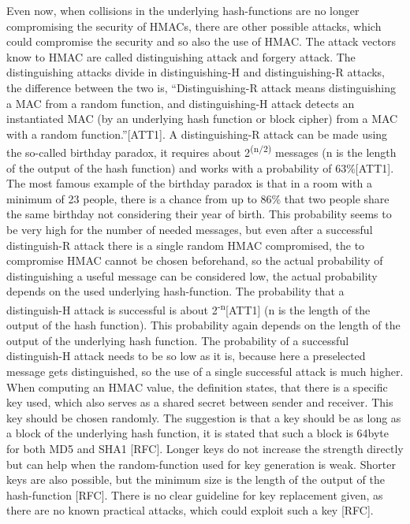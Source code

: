 Even now, when collisions in the underlying hash-functions are no longer compromising the security of HMACs, there are other possible attacks, which could compromise the security and so also the use of HMAC. The attack vectors know to HMAC are called distinguishing attack and forgery attack. The distinguishing attacks divide in distinguishing-H and distinguishing-R attacks, the difference between the two is, “Distinguishing-R attack means distinguishing a MAC from a random function, and distinguishing-H attack detects an instantiated MAC (by an underlying hash function or block cipher) from a MAC with a random function.”[ATT1]. A distinguishing-R attack can be made using the so-called birthday paradox, it requires about 2\textsuperscript{(n$/$2)} messages (n is the length of the output of the hash function) and works with a probability of 63\%[ATT1]. The most famous example of the birthday paradox is that in a room with a minimum of 23 people, there is a chance from up to 86\% that two people share the same birthday not considering their year of birth. This probability seems to be very high for the number of needed messages, but even after a successful distinguish-R attack there is a single random HMAC compromised, the to compromise HMAC cannot be chosen beforehand, so the actual probability of distinguishing a useful message can be considered low, the actual probability depends on the used underlying hash-function. The probability that a distinguish-H attack is successful is about 2\textsuperscript{-n}[ATT1] (n is the length of the output of the hash function). This probability again depends on the length of the output of the underlying hash function. The probability of a successful distinguish-H attack needs to be so low as it is, because here a preselected message gets distinguished, so the use of a single successful attack is much higher. \\
When computing an HMAC value, the definition states, that there is a specific key used, which also serves as a shared secret between sender and receiver. This key should be chosen randomly. The suggestion is that a key should be as long as a block of the underlying hash function, it is stated that such a block is 64byte for both MD5 and SHA1 [RFC]. Longer keys do not increase the strength directly but can help when the random-function used for key generation is weak. Shorter keys are also possible, but the minimum size is the length of the output of the hash-function [RFC]. There is no clear guideline for key replacement given, as there are no known practical attacks, which could exploit such a key [RFC]. \\
